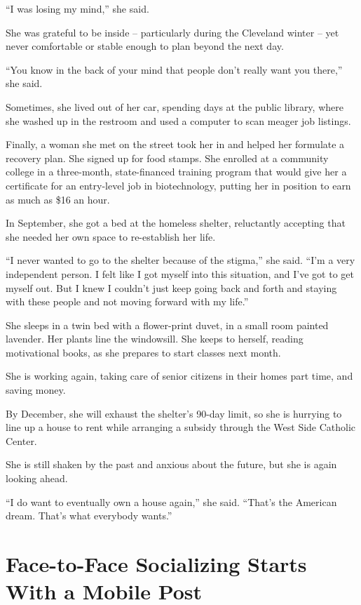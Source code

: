 ﻿\documentclass[12pt]{article}
\begin{document}
``I was losing my mind,'' she said.

She was grateful to be inside -- particularly during the Cleveland winter -- yet never comfortable
or stable enough to plan beyond the next day.

``You know in the back of your mind that people don't really want you there,'' she said.

Sometimes, she lived out of her car, spending days at the public library, where she washed up in the
restroom and used a computer to scan meager\cite{meager} job listings.

Finally, a woman she met on the street took her in and helped her formulate a recovery plan. She
signed up for food stamps. She enrolled at a community college in a three-month, state-financed
training program that would give her a certificate for an entry-level job in biotechnology, putting
her in position to earn as much as \$16 an hour.

In September, she got a bed at the homeless shelter, reluctantly accepting that she needed her own
space to re-establish her life.

``I never wanted to go to the shelter because of the stigma\cite{stigma},'' she said. ``I'm a very
independent person. I felt like I got myself into this situation, and I've got to get myself out.
But I knew I couldn't just keep going back and forth and staying with these people and not moving
forward with my life.''

She sleeps in a twin bed with a flower-print duvet, in a small room painted lavender. Her plants
line the windowsill. She keeps to herself, reading motivational books, as she prepares to start
classes next month.

She is working again, taking care of senior citizens in their homes part time, and saving money.

By December, she will exhaust the shelter's 90-day limit, so she is hurrying to line up a house to
rent while arranging a subsidy through the West Side Catholic Center.

She is still shaken by the past and anxious about the future, but she is again looking ahead.

``I do want to eventually own a house again,'' she said. ``That's the American dream. That's what
everybody wants.''

\section{Face-to-Face Socializing Starts With a Mobile Post}
\end{document}
